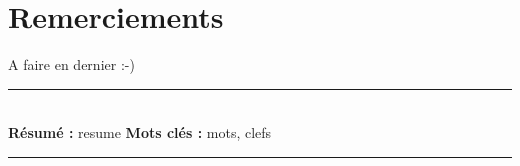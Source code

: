 \documentclass[a4paper,11pt,twoside]{StyleThese}
\begin{document}


    \makeflyleaf


\dominitoc


 \cleardoublepage

\section*{Remerciements}

A faire en dernier :-) 

\tableofcontents

\printnomenclature

\mainmatter







\appendix




%


\cleardoublepage
\begin{vcenterpage}
\noindent\rule[2pt]{\textwidth}{0.5pt}
\\
{\large\textbf{Résumé :}}
resume
{\large\textbf{Mots clés :}}
mots, clefs
\\
\noindent\rule[2pt]{\textwidth}{0.5pt}
\end{vcenterpage}
\end{document}
